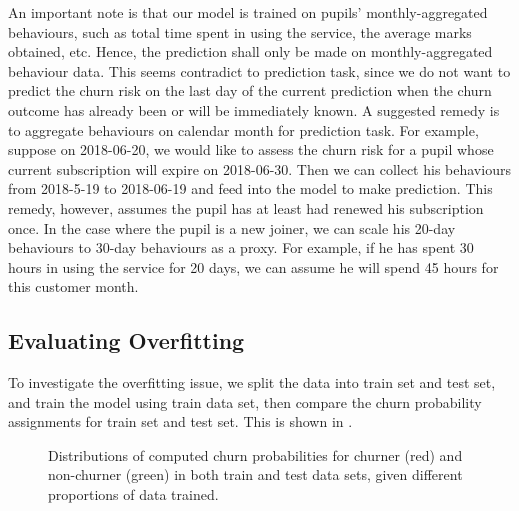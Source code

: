 An important note is that our model is trained on pupils' monthly-aggregated behaviours, such as total time spent in using the service, the average marks obtained, etc. Hence, the prediction shall only be made on monthly-aggregated behaviour data. This seems contradict to prediction task, since we do not want to predict the churn risk on the last day of the current prediction when the churn outcome has already been or will be immediately known. A suggested remedy is to aggregate behaviours on calendar month for prediction task. For example, suppose on 2018-06-20, we would like to assess the churn risk for a pupil whose current subscription will expire on 2018-06-30. Then we can collect his behaviours from 2018-5-19 to 2018-06-19 and feed into the model to make prediction. This remedy, however, assumes the pupil has at least had renewed his subscription once. In the case where the pupil is a new joiner, we can scale his 20-day behaviours to 30-day behaviours as a proxy. For example, if he has spent 30 hours in using the service for 20 days, we can assume he will spend 45 hours for this customer month.

\subsection{Evaluating Overfitting}

To investigate the overfitting issue, we split the data into train set and test set, and train the model using train data set, then compare the churn probability assignments for train set and test set. This is shown in .

\begin{figure}[!h]
\vspace*{-0.5cm}
\centering
	\hspace{0mm}
	\hspace{0mm}
\caption{Distributions of computed churn probabilities for churner (red) and non-churner (green) in both train and test data sets, given different proportions of data trained.}
\label{fig:overfitting}
\end{figure}

